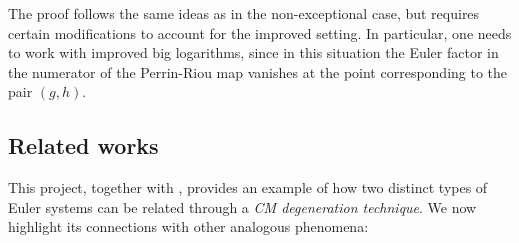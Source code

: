\documentclass[a4paper,11pt]{amsart}
\theoremstyle{plain}
\newtheorem{conj}[theorem]{Conjecture}
\theoremstyle{definition}
\theoremstyle{remark}
\numberwithin{equation}{section}
\begin{document}
The proof follows the same ideas as in the non-exceptional case, but requires certain modifications to account for the improved setting. In particular, one needs to work with improved big logarithms, since in this situation the Euler factor in the numerator of the Perrin-Riou map vanishes at the point corresponding to the pair $(g,h)$.

\subsection{Related works}

This project, together with \cite{BDV}, provides an example of how two distinct types of Euler systems can be related through a {\it CM degeneration technique}. We now highlight its connections with other analogous phenomena:
\end{document}
